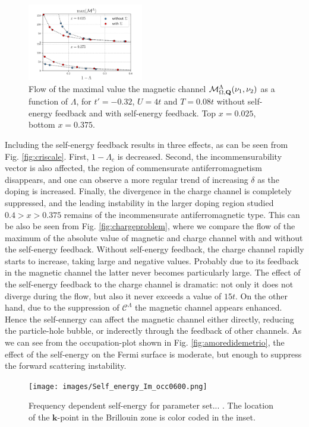\begin{figure}
\includegraphics[width=0.45\textwidth]{images/chargeproblem_M_vs_Lambda_diff_occ.png}
\caption{Flow of the maximal value the magnetic channel $\mathcal{M}^\Lambda_{\Omega,\mathbf{Q}}(\nu_1,\nu_2)$ as a function of $\Lambda$, for $t'=-0.32$, $U=4t$ and $T=0.08t$ without self-energy feedback and with self-energy feedback. Top $x=0.025$, bottom $x=0.375$. }
\label{fig:selfeffect}
\end{figure}

Including the self-energy feedback results in three effects, as can be seen from Fig. \ref{fig:criscale}. 
First, $1-\Lambda_c$ is decreased.
Second, the incommensurability vector is also affected, the region of commensurate antiferromagnetism disappears, and one can observe a more regular trend of increasing $\delta$ as the doping is increased.
Finally, the divergence in the charge channel is completely suppressed, and the leading instability in the larger doping region studied  $0.4> x >0.375$ remains of the incommensurate antiferromagnetic type. 
This can be also be seen from Fig. \ref{fig:chargeproblem}, where we compare the flow of the maximum of the absolute value of magnetic and charge channel with and without the self-energy feedback. Without self-energy feedback, the charge channel rapidly starts to increase, taking large and negative values. Probably due to its feedback in the magnetic channel the latter never becomes particularly large.    
The effect of the self-energy feedback to the charge channel is dramatic: not only it does not diverge during the flow, but also it never exceeds a value of $15t$. 
On the other hand, due to the suppression of $\mathcal{C}^\Lambda$ the magnetic channel appears enhanced.
Hence the self-ennergy can affect the magnetic channel either directly, reducing the particle-hole bubble, or inderectly through the feedback of other channels.   
As we can see from the occupation-plot shown in Fig. \ref{fig:amoredidemetrio}, the effect of the self-energy on the Fermi surface is moderate, but enough to suppress the forward scattering instability. 

\begin{figure}
\texttt{[image: images/Self\_energy\_Im\_occ0600.png]}
\caption{Frequency dependent self-energy for parameter set... .
The location of the $\mathbf{k}$-point in the Brillouin zone is color coded in the inset. }
\label{fig:selffermi0600}
\end{figure}


